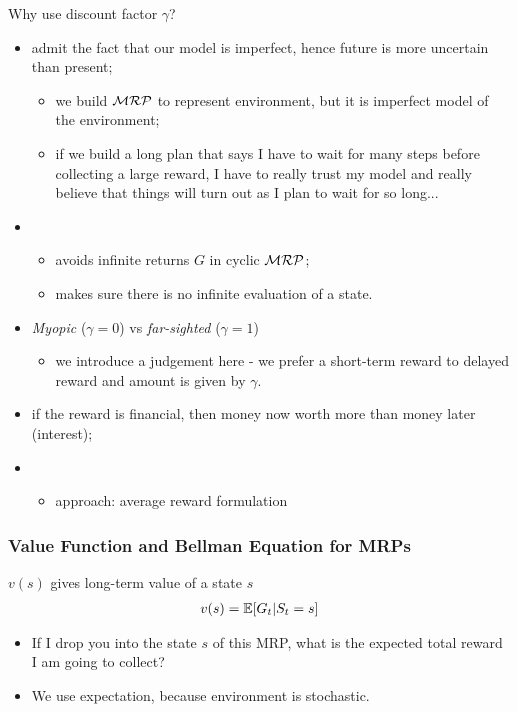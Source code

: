 \begin{notebox}
Why use discount factor $\gamma$?
\begin{itemize}
	\item admit the fact that our model is imperfect, hence future is more uncertain than present;
	\begin{itemize}
		\item we build $\mathcal{MRP}$ to represent environment, but it is imperfect model of the environment;
		\item if we build a long plan that says I have to wait for many steps before collecting a large reward, I have to really trust my model and really believe that things will turn out as I plan to wait for so long...
	\end{itemize} 
	\item {}
	\begin{itemize}
		\item avoids infinite returns $G$ in cyclic $\mathcal{MRP}$;
		\item makes sure there is no infinite evaluation of a state.
	\end{itemize}
	\item \textit{Myopic} ($\gamma=0$) vs \textit{far-sighted} ($\gamma=1$)
	\begin{itemize}
		\item we introduce a judgement here - we prefer a short-term reward to delayed reward and amount is given by $\gamma$.
	\end{itemize}
	\item if the reward is financial, then money now worth more than money later (interest);
	\item {}
	\begin{itemize}
		\item approach: average reward formulation
	\end{itemize}
\end{itemize}
\end{notebox}

\subsubsection{Value Function and Bellman Equation for MRPs}

 $v(s)$ gives long-term value of a state $s$
\begin{align}
	v(s) = \operatorname{\mathbb{E}}[G_t | S_t = s]
\end{align}
\begin{itemize}
	\item If I drop you into the state $s$ of this MRP, what is the expected total reward I am going to collect?
	\item We use expectation, because environment is stochastic.
\end{itemize}

